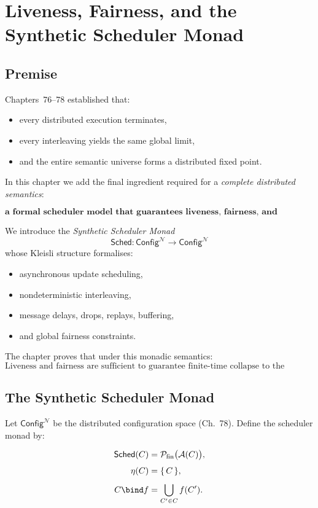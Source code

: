 \chapter{Liveness, Fairness, and the Synthetic Scheduler Monad}
\label{ch:79}

\section{Premise}

Chapters~76--78 established that:

\begin{itemize}
\item every distributed execution terminates,
\item every interleaving yields the same global limit,
\item and the entire semantic universe forms a distributed fixed point.
\end{itemize}

In this chapter we add the final ingredient required for a
\emph{complete distributed semantics}:

\[
\textbf{a formal scheduler model that guarantees liveness, fairness,
and correctness of convergence.}
\]

We introduce the \emph{Synthetic Scheduler Monad}
\[
\mathsf{Sched} : \mathsf{Config}^{\mathcal{N}} \to \mathsf{Config}^{\mathcal{N}}
\]
whose Kleisli structure formalises:
\begin{itemize}
\item asynchronous update scheduling,
\item nondeterministic interleaving,
\item message delays, drops, replays, buffering,
\item and global fairness constraints.
\end{itemize}

The chapter proves that under this monadic semantics:
\[
\boxed{
\text{Liveness and fairness are sufficient to guarantee  
finite-time collapse to the universal fixed point.}
}
\]


\section{The Synthetic Scheduler Monad}

Let $\mathsf{Config}^{\mathcal{N}}$ be the distributed configuration space
(Ch.~78).  
Define the scheduler monad by:

\begin{align}
\mathsf{Sched}(C) 
  &= \mathcal{P}_{\mathrm{fin}}
     \bigl(\mathcal{A}(C)\bigr), \\[4pt]
\eta(C)
  &= \{\,C\,\}, \\[4pt]
C \bind f
  &= \bigcup_{C' \in C} f(C').
\end{align}

